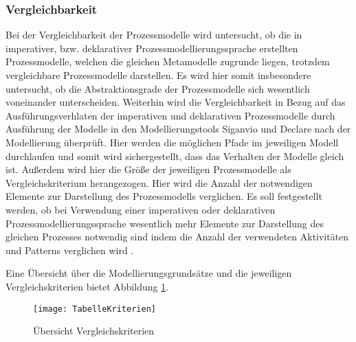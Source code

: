 \subsubsection{Vergleichbarkeit}
Bei der Vergleichbarkeit der Prozessmodelle wird untersucht, ob die in imperativer, bzw. deklarativer Prozessmodellierungssprache erstellten Prozessmodelle, welchen die gleichen Metamodelle zugrunde liegen, trotzdem vergleichbare Prozessmodelle darstellen. Es wird hier somit insbesondere untersucht, ob die Abstraktionsgrade der Prozessmodelle sich wesentlich voneinander unterscheiden. Weiterhin wird die Vergleichbarkeit in Bezug auf das Ausführungsverhlaten der imperativen und deklarativen Prozessmodelle durch Ausführung der Modelle in den Modellierungstools Siganvio und Declare nach der Modellierung überprüft. Hier werden die möglichen Pfade im jeweiligen Modell durchlaufen und somit wird sichergestellt, dass das Verhalten der Modelle gleich ist. Außerdem wird hier die Größe der jeweiligen Prozessmodelle als Vergleichskriterium herangezogen. Hier wird die Anzahl der notwendigen Elemente zur Darstellung des Prozessmodells verglichen. Es soll festgestellt werden, ob bei Verwendung einer imperativen oder deklarativen Prozessmodellierungssprache wesentlich mehr Elemente zur Darstellung des gleichen Prozesses notwendig sind indem die Anzahl der verwendeten Aktivitäten und Patterns verglichen wird \cite{leimeister2012, journals95, freund2007,reinshagen2009}.

Eine Übersicht über die Modellierungsgrundsätze und die jeweiligen Vergleichskriterien bietet Abbildung \ref{fig:TabelleKriterien}.

\begin{figure}[!htbp]
\begin{center}
  \texttt{[image: TabelleKriterien]} %
  \caption{Übersicht Vergleichskriterien}
  \label{fig:TabelleKriterien}
\end{center}
\end{figure}








